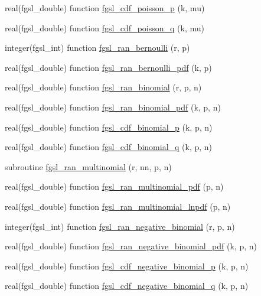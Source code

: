 \begin{DoxyCompactItemize}
\item 
real(fgsl\+\_\+double) function \hyperlink{rng_8finc_ab2613ed5965934db464cf780a49a7e4c}{fgsl\+\_\+cdf\+\_\+poisson\+\_\+p} (k, mu)
\item 
real(fgsl\+\_\+double) function \hyperlink{rng_8finc_a8cd213b3445aca4ba8cf6b25f12691ac}{fgsl\+\_\+cdf\+\_\+poisson\+\_\+q} (k, mu)
\item 
integer(fgsl\+\_\+int) function \hyperlink{rng_8finc_afd1f26e55ad5ea5baa69e3a2b7539361}{fgsl\+\_\+ran\+\_\+bernoulli} (r, p)
\item 
real(fgsl\+\_\+double) function \hyperlink{rng_8finc_a59759fbd2da5f1ba46671c1f88303305}{fgsl\+\_\+ran\+\_\+bernoulli\+\_\+pdf} (k, p)
\item 
real(fgsl\+\_\+double) function \hyperlink{rng_8finc_a4ee52af6322119ef765d429be9f24c33}{fgsl\+\_\+ran\+\_\+binomial} (r, p, n)
\item 
real(fgsl\+\_\+double) function \hyperlink{rng_8finc_a5ce6b40d19ba62b14e1603e821ea1eb1}{fgsl\+\_\+ran\+\_\+binomial\+\_\+pdf} (k, p, n)
\item 
real(fgsl\+\_\+double) function \hyperlink{rng_8finc_ab413ce31101954114fe2c271532c05da}{fgsl\+\_\+cdf\+\_\+binomial\+\_\+p} (k, p, n)
\item 
real(fgsl\+\_\+double) function \hyperlink{rng_8finc_a9a4484096d0c58e6b7f0f5994196c78c}{fgsl\+\_\+cdf\+\_\+binomial\+\_\+q} (k, p, n)
\item 
subroutine \hyperlink{rng_8finc_ae64fcca5836f5d128802d78dd35d13ef}{fgsl\+\_\+ran\+\_\+multinomial} (r, nn, p, n)
\item 
real(fgsl\+\_\+double) function \hyperlink{rng_8finc_a659a9afd7978f7596edb889d73ae0889}{fgsl\+\_\+ran\+\_\+multinomial\+\_\+pdf} (p, n)
\item 
real(fgsl\+\_\+double) function \hyperlink{rng_8finc_aafc2f5a38b757191144c10b81656f852}{fgsl\+\_\+ran\+\_\+multinomial\+\_\+lnpdf} (p, n)
\item 
integer(fgsl\+\_\+int) function \hyperlink{rng_8finc_ab25a0cc345a2b7acbac9430436e54362}{fgsl\+\_\+ran\+\_\+negative\+\_\+binomial} (r, p, n)
\item 
real(fgsl\+\_\+double) function \hyperlink{rng_8finc_aaf108cb550b6c3f7cc34cd7b12763b2f}{fgsl\+\_\+ran\+\_\+negative\+\_\+binomial\+\_\+pdf} (k, p, n)
\item 
real(fgsl\+\_\+double) function \hyperlink{rng_8finc_a907fcf3e4f47bf6af2cdf8c849925576}{fgsl\+\_\+cdf\+\_\+negative\+\_\+binomial\+\_\+p} (k, p, n)
\item 
real(fgsl\+\_\+double) function \hyperlink{rng_8finc_a9814ca89dedaa922543eb568e7060a9d}{fgsl\+\_\+cdf\+\_\+negative\+\_\+binomial\+\_\+q} (k, p, n)

\end{DoxyCompactItemize}
